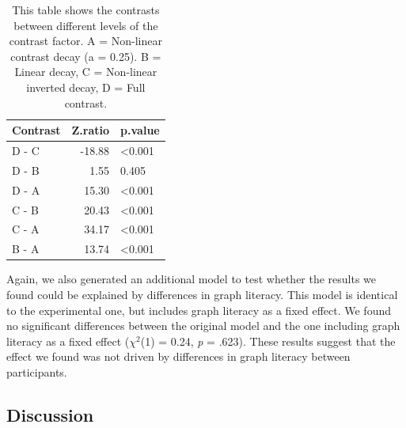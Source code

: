 \documentclass[preprint, 3p,
authoryear]{elsarticle} %
\begin{document}
\begin{table}

\caption{\label{tab:contrasts-table-e2}\label{contrasts-table-e2}This table shows the contrasts between different levels of the contrast factor. A = Non-linear contrast decay (a = 0.25). B = Linear decay, C = Non-linear inverted decay, D = Full contrast.}
\centering
\begin{tabular}[t]{lrl}
\toprule
Contrast & Z.ratio & p.value\\
\midrule
D - C & -18.88 & <0.001\\
D - B & 1.55 & 0.405\\
D - A & 15.30 & <0.001\\
C - B & 20.43 & <0.001\\
C - A & 34.17 & <0.001\\
\addlinespace
B - A & 13.74 & <0.001\\
\bottomrule
\end{tabular}
\end{table}

Again, we also generated an additional model to test whether the results
we found could be explained by differences in graph literacy. This model
is identical to the experimental one, but includes graph literacy as a
fixed effect. We found no significant differences between the original
model and the one including graph literacy as a fixed effect
(\(\chi^2\)(1) = 0.24, \emph{p} = .623). These results suggest that the
effect we found was not driven by differences in graph literacy between
participants.

\hypertarget{discussion-1}{%
\subsection{Discussion}\label{discussion-1}}
\end{document}
